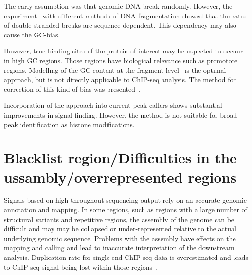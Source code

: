 The early assumption was that genomic DNA break randomly.
However, the experiment~\cite{poptsova2014non} with different methods of DNA fragmentation showed that the rates of double-stranded breaks are sequence-dependent.
This dependency may also cause the GC-bias. 


However, true binding sites of the protein of interest may be expected to occour in high GC regions.
Those regions have biological relevance such as promotore regions.
Modelling of the GC-content at the fragment level~\cite{benjamini2012summarizing} is the optimal approach, but is not directly applicable to ChIP-seq analysis.
The method for correction of this kind of bias was presented~\cite{teng2017accounting}.

Incorporation of the approach into current peak callers shows substantial improvements in signal finding.
However, the method is not suitable for broad peak identification as histone modifications.





\section{Blacklist region/Difficulties in the ussambly/overrepresented regions}

Signals based on high-throughout sequencing output rely on an accurate genomic annotation and mapping.
In some regions, such as regions with a large number of structural variants and repetitive regions, the assembly of the genome can be difficult and may may be collapsed or under-represented relative to the actual underlying genomic sequence.
Problems with the assembly have effects on the mapping and calling and lead to inaccurate interpretation of the downstream analysis.
Duplication rate for single-end ChIP-seq data is overestimated and leads to ChIP-seq signal being lost within those regions~\cite{chen2012systematic}.

